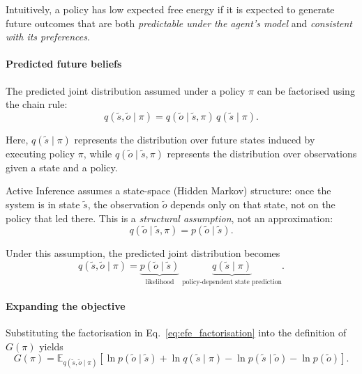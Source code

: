 \documentclass[a4paper, twoside]{article}
\begin{document}
Intuitively, a policy has low expected free energy if it is expected to generate
future outcomes that are both \emph{predictable under the agent's model} and
\emph{consistent with its preferences}.

\paragraph{Predicted future beliefs}

The predicted joint distribution assumed under a policy $\pi$ can be factorised
using the chain rule:
\begin{equation}
q(\tilde{s},\tilde{o}\mid\pi)
=
q(\tilde{o}\mid\tilde{s},\pi)\,q(\tilde{s}\mid\pi).
\end{equation}

Here, $q(\tilde{s}\mid\pi)$ represents the distribution over future states induced
by executing policy $\pi$, while $q(\tilde{o}\mid\tilde{s},\pi)$ represents the
distribution over observations given a state and a policy.

Active Inference assumes a state-space (Hidden Markov) structure: once the system
is in state $\tilde{s}$, the observation $\tilde{o}$ depends only on that state,
not on the policy that led there. This is a \emph{structural assumption}, not an
approximation:
\begin{equation}
q(\tilde{o}\mid\tilde{s},\pi) = p(\tilde{o}\mid\tilde{s}).
\end{equation}

Under this assumption, the predicted joint distribution becomes
\begin{equation}
q(\tilde{s},\tilde{o}\mid\pi)
=
\underbrace{p(\tilde{o}\mid\tilde{s})}_{\text{likelihood}}
\;
\underbrace{q(\tilde{s}\mid\pi)}_{\text{policy-dependent state prediction}}.
\label{eq:efe_factorisation}
\end{equation}

\paragraph{Expanding the objective}

Substituting the factorisation in
Eq.~\eqref{eq:efe_factorisation} into the definition of $G(\pi)$ yields
\begin{equation}
G(\pi)
=
\mathbb{E}_{q(\tilde{s},\tilde{o}\mid\pi)}
\left[
\ln p(\tilde{o}\mid\tilde{s})
+
\ln q(\tilde{s}\mid\pi)
-
\ln p(\tilde{s}\mid\tilde{o})
-
\ln p(\tilde{o})
\right].
\end{equation}
\end{document}
